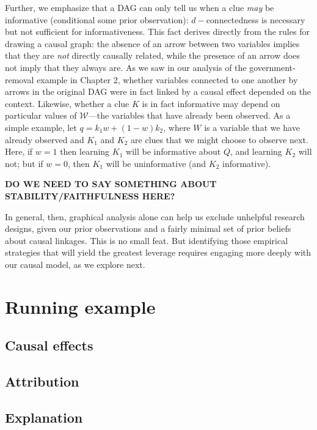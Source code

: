 \documentclass[12pt,]{book}
\begin{document}
Further, we emphasize that a DAG can only tell us when a clue \emph{may} be informative (conditional some prior observation): \(d-\)connectedness is necessary but not sufficient for informativeness. This fact derives directly from the rules for drawing a causal graph: the absence of an arrow between two variables implies that they are \emph{not} directly causally related, while the presence of an arrow does not imply that they always are. As we saw in our analysis of the government-removal example in Chapter 2, whether variables connected to one another by arrows in the original DAG were in fact linked by a causal effect depended on the context. Likewise, whether a clue \(K\) is in fact informative may depend on particular values of \(\mathcal W\)---the variables that have already been observed. As a simple example, let \(q = k_1w + (1-w)k_2\), where \(W\) is a variable that we have already observed and \(K_1\) and \(K_2\) are clues that we might choose to observe next. Here, if \(w=1\) then learning \(K_1\) will be informative about \(Q\), and learning \(K_2\) will not; but if \(w=0\), then \(K_1\) will be uninformative (and \(K_2\) informative).

\textbf{DO WE NEED TO SAY SOMETHING ABOUT STABILITY/FAITHFULNESS HERE?}

In general, then, graphical analysis alone can help us exclude unhelpful research designs, given our prior observations and a fairly minimal set of prior beliefs about causal linkages. This is no small feat. But identifying those empirical strategies that will yield the greatest leverage requires engaging more deeply with our causal model, as we explore next.

\hypertarget{running-example}{%
\section{Running example}\label{running-example}}

\hypertarget{causal-effects}{%
\subsection{Causal effects}\label{causal-effects}}

\hypertarget{attribution}{%
\subsection{Attribution}\label{attribution}}

\hypertarget{explanation}{%
\subsection{Explanation}\label{explanation}}
\end{document}
